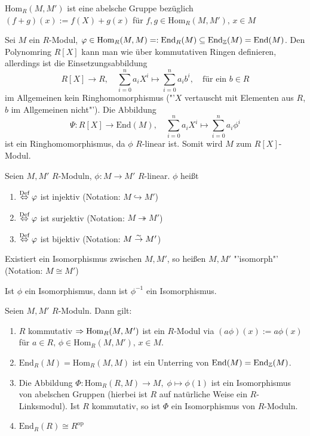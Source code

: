 \begin{anm}
	$\text{Hom}_R(M,M')$ ist eine abelsche Gruppe bezüglich $(f+g)(x) := f(X) + g(x)$ für $f,g\in \text{Hom}_R(M, M'), \, x\in M$
\end{anm}
\begin{bsp}
	Sei $M$ ein $R$-Modul, $\varphi\in \text{Hom}_R(M, M)=: \text{End}_R(M) \subseteq \text{End}_{\mathbb{Z}}(M) = \text{End}(M)$. Den Polynomring $R[X]$ kann man wie über kommutativen Ringen definieren, allerdings ist die Einsetzungsabbildung 
	$$R[X] \to R, \quad \sum_{i=0}^na_i X^i\mapsto \sum_{i=0}^na_ib^i, \quad \text{für ein } b\in R$$
	im Allgemeinen kein Ringhomomorphismus ("'$X$ vertauscht mit Elementen aus $R$, $b$ im Allgemeinen nicht"'). Die Abbildung 
	$$\Psi:R[X] \to \text{End}(M), \quad \sum_{i=0}^n a_i X^i \mapsto \sum_{i=0}^n a_i \phi^i$$
	ist ein Ringhomomorphismus, da $\phi$ $R$-linear ist. Somit wird $M$ zum $R[X]$-Modul.
\end{bsp}
\begin{df}\label{1.5}
	Seien $M,M'$ $R$-Moduln, $\phi:M\to M'$ $R$-linear. $\phi$ heißt 
	\begin{enumerate}
		\item[]  $\overset{\text{Def}}{\Leftrightarrow} \varphi$ ist injektiv (Notation: $M \hookrightarrow M'$)
		\item[]  $\overset{\text{Def}}{\Leftrightarrow} \varphi$ ist surjektiv (Notation: $M \twoheadrightarrow M'$)
		\item[]  $\overset{\text{Def}}{\Leftrightarrow} \varphi$ ist bijektiv (Notation: $M \overset{\sim}{\rightarrow} M'$)
	\end{enumerate}
	Existiert ein Isomorphismus zwischen $M,M'$, so heißen $M,M'$ "'isomorph"' (Notation: $M \cong M'$)
\end{df}
\begin{anm}
	Ist $\phi$ ein Isomorphismus, dann ist $\phi^{-1}$ ein Isomorphismus.
\end{anm}
\begin{bem}
	Seien $M,M'$ $R$-Moduln. Dann gilt:
	\begin{enumerate}[label=\alph*)]
		\item $R$ kommutativ $\Rightarrow \text{Hom}_R(M, M')$ ist ein $R$-Modul via $(a \phi)(x):= a\phi(x)$ für $a\in R, \, \phi \in \text{Hom}_R(M, M'), \, x\in M$.
		\item $\text{End}_R(M) = \text{Hom}_R(M, M)$ ist ein Unterring von $\text{End}(M) = \text{End}_{\mathbb{Z}}(M)$.
		\item Die Abbildung $\Phi:\text{Hom}_R(R, M)\to M, \; \phi \mapsto \phi(1)$ ist ein Isomorphismus von abelschen Gruppen (hierbei ist $R$ auf natürliche Weise ein $R$-Linksmodul). Ist $R$ kommutativ, so ist $\Phi$ ein Isomorphismus von $R$-Moduln.
		\item $\text{End}_R(R)\cong R^\text{op}$
	\end{enumerate}
\end{bem}
